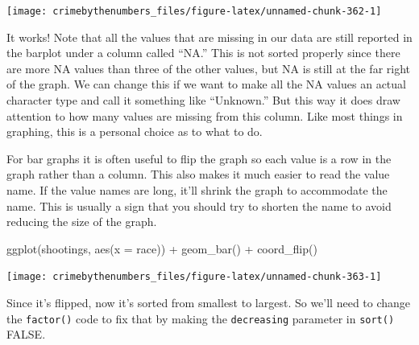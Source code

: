 \documentclass[
]{krantz}
\makeatletter
\newenvironment{Shaded}{\begin{snugshade}}{\end{snugshade}}
\newcommand{\AttributeTok}[1]{\textcolor[rgb]{0.61,0.61,0.61}{#1}}
\newcommand{\ConstantTok}[1]{\textcolor[rgb]{0,0,0}{#1}}
\newcommand{\FunctionTok}[1]{\textcolor[rgb]{0,0,0}{#1}}
\newcommand{\NormalTok}[1]{#1}
\newcommand{\OtherTok}[1]{\textcolor[rgb]{0.37,0.37,0.37}{#1}}
\newcommand{\SpecialCharTok}[1]{\textcolor[rgb]{0,0,0}{#1}}
\newenvironment{kframe}{%
\medskip{}
\setlength{\fboxsep}{.8em}
 \def\at@end@of@kframe{}%
 \ifinner\ifhmode%
  \def\at@end@of@kframe{\end{minipage}}%
  \begin{minipage}{\columnwidth}%
 \fi\fi%
 \def\FrameCommand##1{\hskip\@totalleftmargin \hskip-\fboxsep
 \colorbox{shadecolor}{##1}\hskip-\fboxsep
     \hskip-\linewidth \hskip-\@totalleftmargin \hskip\columnwidth}%
 \MakeFramed {\advance\hsize-\width
   \@totalleftmargin\z@ \linewidth\hsize
   \@setminipage}}%
 {\par\unskip\endMakeFramed%
 \at@end@of@kframe}
\renewenvironment{Shaded}{\begin{kframe}}{\end{kframe}}
\makeatother
\begin{document}
\begin{center}\texttt{[image: crimebythenumbers\_files/figure-latex/unnamed-chunk-362-1]} \end{center}

It works! Note that all the values that are missing in our
data are still reported in the barplot under a column called
``NA.'' This is not sorted properly since there are more NA
values than three of the other values, but NA is still at
the far right of the graph. We can change this if we want to
make all the NA values an actual character type and call it
something like ``Unknown.'' But this way it does draw
attention to how many values are missing from this column.
Like most things in graphing, this is a personal choice as
to what to do.

For bar graphs it is often useful to flip the graph so each
value is a row in the graph rather than a column. This also
makes it much easier to read the value name. If the value
names are long, it'll shrink the graph to accommodate the
name. This is usually a sign that you should try to shorten
the name to avoid reducing the size of the graph.

\begin{Shaded}
\begin{Highlighting}[]
\FunctionTok{ggplot}\NormalTok{(shootings, }\FunctionTok{aes}\NormalTok{(}\AttributeTok{x =}\NormalTok{ race)) }\SpecialCharTok{+}
  \FunctionTok{geom\_bar}\NormalTok{() }\SpecialCharTok{+}
  \FunctionTok{coord\_flip}\NormalTok{()}
\end{Highlighting}
\end{Shaded}

\begin{center}\texttt{[image: crimebythenumbers\_files/figure-latex/unnamed-chunk-363-1]} \end{center}

Since it's flipped, now it's sorted from smallest to
largest. So we'll need to change the \texttt{factor()} code
to fix that by making the \texttt{decreasing} parameter in
\texttt{sort()} FALSE.

\begin{Shaded}
\end{Shaded}
\end{document}
